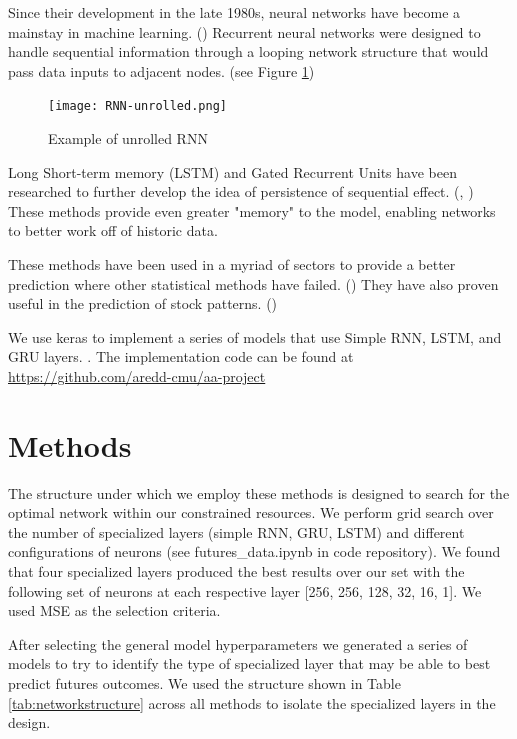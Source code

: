 \documentclass[twoside,11pt]{article}
\begin{document}
Since their development in the late 1980s, neural networks have become a mainstay in machine learning. (\cite{Schmidhuber2015}) Recurrent neural networks were designed to handle sequential information through a looping network structure that would pass data inputs to adjacent nodes. (see Figure \ref{fig:unrolledRNN})

\begin{figure}[htbp]
	\centering
	\texttt{[image: RNN-unrolled.png]}
	\caption{Example of unrolled RNN}\label{fig:unrolledRNN}
\end{figure}

Long Short-term memory (LSTM) and Gated Recurrent Units have been researched to further develop the idea of persistence of sequential effect. (\cite{Hochreiter1997}, \cite{Chung}) These methods provide even greater "memory" to the model, enabling networks to better work off of historic data. 

These methods have been used in a myriad of sectors to provide a better prediction where other statistical methods have failed. (\cite{Ugurlu2018}) They have also proven useful in the prediction of stock patterns. (\cite{YoungohcYoon}) 

We use keras to implement a series of models that use Simple RNN, LSTM, and GRU layers. \cite{chollet2015keras}. The implementation code can be found at \url{https://github.com/aredd-cmu/aa-project}

\section{Methods} \label{Methods}

The structure under which we employ these methods is designed to search for the optimal network within our constrained resources. We perform grid search over the number of specialized layers (simple RNN, GRU, LSTM) and different configurations of neurons (see futures\_data.ipynb in code repository). We found that four specialized layers produced the best results over our set with the following set of neurons at each respective layer [256, 256, 128, 32, 16, 1]. We used MSE as the selection criteria.

After selecting the general model hyperparameters we generated a series of models to try to identify the type of specialized layer that may be able to best predict futures outcomes. We used the structure shown in Table \ref{tab:networkstructure} across all methods to isolate the specialized layers in the design.
\end{document}
